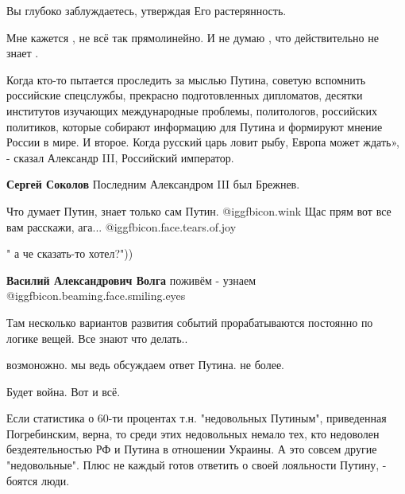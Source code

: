 \begin{itemize}
Вы глубоко заблуждаетесь, утверждая Его растерянность.

Мне кажется , не всё так прямолинейно. И не думаю , что действительно не знает .


Когда кто-то пытается проследить за мыслью Путина, советую вспомнить российские
спецслужбы, прекрасно подготовленных дипломатов, десятки институтов изучающих
международные проблемы, политологов, российских политиков, которые собирают
информацию для Путина и формируют мнение России в мире. И второе. Когда русский
царь ловит рыбу, Европа может ждать», - сказал Александр III, Российский
император.

\begin{itemize} %
\textbf{Сергей Соколов} Последним Александром III был Брежнев.
\end{itemize} %


Что думает Путин, знает только сам Путин.  @igg{fbicon.wink}  Щас прям вот все вам расскажи,
ага...  @igg{fbicon.face.tears.of.joy} 

\begin{itemize} %
" а че сказать-то хотел?"))

\textbf{Василий Александрович Волга} поживём - узнаем  @igg{fbicon.beaming.face.smiling.eyes} 
\end{itemize} %

Там несколько вариантов развития событий прорабатываются постоянно по логике вещей. Все знают что делать..

\begin{itemize} %
возмоножно. мы ведь обсуждаем ответ Путина. не более.
\end{itemize} %

Будет война. Вот и всё.


Если статистика о 60-ти процентах т.н. "недовольных Путиным", приведенная
Погребинским, верна, то среди этих недовольных немало тех, кто недоволен
бездеятельностью РФ и Путина в отношении Украины. А это совсем другие
"недовольные". Плюс не каждый готов ответить о своей лояльности Путину, -
боятся люди.




\end{itemize}
